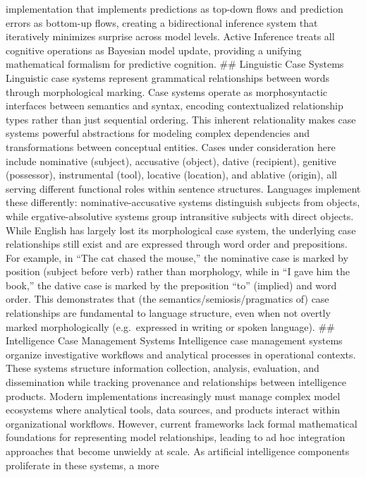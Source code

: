 \documentclass[
  11pt,
  letterpaper,
]{article}
\begin{document}
implementation that implements predictions as top-down flows and
prediction errors as bottom-up flows, creating a bidirectional inference
system that iteratively minimizes surprise across model levels. Active
Inference treats all cognitive operations as Bayesian model update,
providing a unifying mathematical formalism for predictive cognition.
\#\# Linguistic Case Systems Linguistic case systems represent
grammatical relationships between words through morphological marking.
Case systems operate as morphosyntactic interfaces between semantics and
syntax, encoding contextualized relationship types rather than just
sequential ordering. This inherent relationality makes case systems
powerful abstractions for modeling complex dependencies and
transformations between conceptual entities. Cases under consideration
here include nominative (subject), accusative (object), dative
(recipient), genitive (possessor), instrumental (tool), locative
(location), and ablative (origin), all serving different functional
roles within sentence structures. Languages implement these differently:
nominative-accusative systems distinguish subjects from objects, while
ergative-absolutive systems group intransitive subjects with direct
objects. While English has largely lost its morphological case system,
the underlying case relationships still exist and are expressed through
word order and prepositions. For example, in ``The cat chased the
mouse,'' the nominative case is marked by position (subject before verb)
rather than morphology, while in ``I gave him the book,'' the dative
case is marked by the preposition ``to'' (implied) and word order. This
demonstrates that (the semantics/semiosis/pragmatics of) case
relationships are fundamental to language structure, even when not
overtly marked morphologically (e.g.~expressed in writing or spoken
language). \#\# Intelligence Case Management Systems Intelligence case
management systems organize investigative workflows and analytical
processes in operational contexts. These systems structure information
collection, analysis, evaluation, and dissemination while tracking
provenance and relationships between intelligence products. Modern
implementations increasingly must manage complex model ecosystems where
analytical tools, data sources, and products interact within
organizational workflows. However, current frameworks lack formal
mathematical foundations for representing model relationships, leading
to ad hoc integration approaches that become unwieldy at scale. As
artificial intelligence components proliferate in these systems, a more
\end{document}
